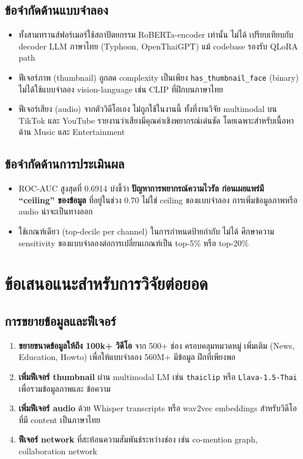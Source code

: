 \subsection{ข้อจำกัดด้านแบบจำลอง}
\begin{itemize}[leftmargin=2em]
  \item ทั้งสามทรานส์ฟอร์เมอร์ใช้สถาปัตยกรรม RoBERTa-encoder เท่านั้น ไม่ได้
        เปรียบเทียบกับ decoder LLM ภาษาไทย (Typhoon, OpenThaiGPT) แม้
        codebase รองรับ QLoRA path
  \item ฟีเจอร์ภาพ (thumbnail) ถูกลด complexity เป็นเพียง \texttt{has\_thumbnail\_face}
        (binary) ไม่ได้ใช้แบบจำลอง vision-language เช่น CLIP ที่ฝึกบนภาษาไทย
  \item ฟีเจอร์เสียง (audio) จากตัววิดีโอเอง ไม่ถูกใช้ในงานนี้ ทั้งที่งานวิจัย
        multimodal บน TikTok และ YouTube รายงานว่าเสียงมีคุณค่าเชิงพยากรณ์เด่นชัด
        โดยเฉพาะสำหรับเนื้อหาด้าน Music และ Entertainment
\end{itemize}

\subsection{ข้อจำกัดด้านการประเมินผล}
\begin{itemize}[leftmargin=2em]
  \item ROC-AUC สูงสุดที่ 0.6914 บ่งชี้ว่า \textbf{ปัญหาการพยากรณ์ความไวรัล
        ก่อนเผยแพร่มี ``ceiling'' ของข้อมูล} ที่อยู่ในช่วง 0.70 ไม่ใช่ ceiling
        ของแบบจำลอง การเพิ่มข้อมูลภาพหรือ audio น่าจะเป็นทางออก
  \item ใช้เกณฑ์เดียว (top-decile per channel) ในการกำหนดป้ายกำกับ ไม่ได้
        ศึกษาความ sensitivity ของแบบจำลองต่อการเปลี่ยนเกณฑ์เป็น top-5\% หรือ
        top-20\%
\end{itemize}

\section{ข้อเสนอแนะสำหรับการวิจัยต่อยอด}
\label{sec:conclusion-future}

\subsection{การขยายข้อมูลและฟีเจอร์}
\begin{enumerate}[leftmargin=2em]
  \item \textbf{ขยายขนาดข้อมูลให้ถึง 100k+ วิดีโอ} จาก 500+ ช่อง ครอบคลุมหมวดหมู่
        เพิ่มเติม (News, Education, Howto) เพื่อให้แบบจำลอง 560M$+$ มีข้อมูล
        ฝึกที่เพียงพอ
  \item \textbf{เพิ่มฟีเจอร์ thumbnail} ผ่าน multimodal LM เช่น
        \texttt{thaiclip} หรือ \texttt{Llava-1.5-Thai} เพื่อรวมข้อมูลภาพและ
        ข้อความ
  \item \textbf{เพิ่มฟีเจอร์ audio} ด้วย Whisper transcripts หรือ wav2vec
        embeddings สำหรับวิดีโอที่มี content เป็นภาษาไทย
  \item \textbf{ฟีเจอร์ network} ที่สะท้อนความสัมพันธ์ระหว่างช่อง เช่น
        co-mention graph, collaboration network
\end{enumerate}

